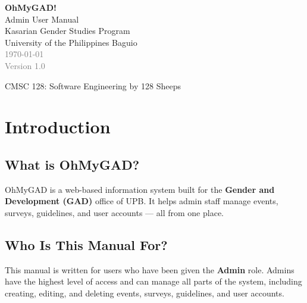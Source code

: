 \documentclass[12pt, a4paper]{article}
\begin{document}
\begin{titlepage}
  \centering
  \vspace*{3cm}


  {\Huge\bfseries\textcolor{primarydark}{OhMyGAD!}}\\[0.4cm]
  {\LARGE\textcolor{primarydark}{Admin User Manual}}\\[1.5cm]

  {\large Kasarian Gender Studies Program}\\[0.5cm]
  {\large University of the Philippines Baguio}\\[2cm]

  \textcolor{gray}{\today}\\[0.5cm]
  \textcolor{gray}{Version 1.0}

  \vfill
  {\small CMSC 128: Software Engineering}
  {\small by 128 Sheeps}
\end{titlepage}

\tableofcontents
\newpage

\section{Introduction}

\subsection{What is OhMyGAD?}
OhMyGAD is a web-based information system built for the \textbf{Gender and Development (GAD)} office of UPB. It helps admin staff manage events, surveys, guidelines, and user accounts — all from one place.

\subsection{Who Is This Manual For?}
This manual is written for users who have been given the \textbf{Admin} role. Admins have the highest level of access and can manage all parts of the system, including creating, editing, and deleting events, surveys, guidelines, and user accounts.
\end{document}
